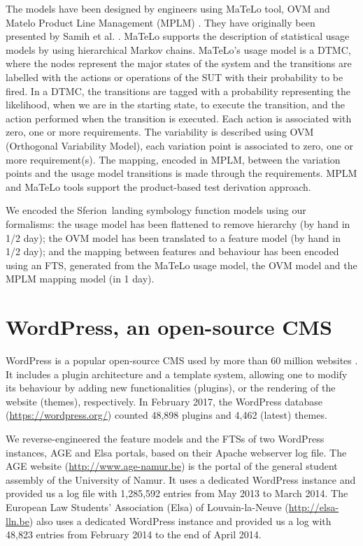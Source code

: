 The models have been designed by engineers using MaTeLo \cite{matelo} tool, OVM and Matelo Product Line Management (MPLM) \cite{Samih2014b}. They have originally been presented by Samih et al. \cite{Samih2014c}. MaTeLo supports the description of statistical usage models by using hierarchical Markov chains. MaTeLo's usage model is a \gls{DTMC}, where the nodes represent the major states of the system and the transitions are labelled with the actions or operations of the SUT with their probability to be fired. In a DTMC, the transitions are tagged with a probability representing the likelihood, when we are in the starting state, to execute the transition, and the action performed when the transition is executed. Each action is associated with zero, one or more requirements. The variability is described using OVM (Orthogonal Variability Model), each variation point is associated to zero, one or more requirement(s). The mapping, encoded in MPLM, between the variation points and the usage model transitions is made through the requirements. MPLM and MaTeLo tools support the product-based test derivation approach.

We encoded the Sferion\texttrademark ~landing symbology function models using our formalisms: the usage model has been flattened to remove hierarchy (by hand in 1/2 day); the OVM model has been translated to a feature model (by hand in 1/2 day); and the mapping between features and behaviour has been encoded using an FTS, generated from the MaTeLo usage model, the OVM model and the MPLM mapping model (in 1 day).


\section{WordPress, an open-source CMS}

\label{sec:casestudy:wordpress}

WordPress \cite{wordpress} is a popular open-source \acrfull{CMS} used by more than 60 million websites \cite{Colao2012}. It includes a plugin architecture and a template system, allowing one to modify its behaviour by adding new functionalities (\ie plugins), or the rendering of the website (\ie themes), respectively. In February 2017, the WordPress database (\url{https://wordpress.org/}) counted 48,898 plugins and 4,462 (latest) themes. 

We reverse-engineered the feature models and the FTSs of two WordPress instances, AGE and Elsa portals, based on their Apache webserver log file. The \gls{AGE} website (\url{http://www.age-namur.be}) is the portal of the general student assembly of the University of Namur. It uses a dedicated WordPress instance and provided us a log file with 1,285,592 entries from May 2013 to March 2014. The European Law Students' Association (Elsa) of Louvain-la-Neuve  (\url{http://elsa-lln.be}) also uses a dedicated WordPress instance and provided us a log with 48,823 entries from February 2014 to the end of April 2014.


